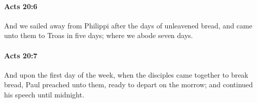 		\paragraph{Acts 20:6} %
			\label{ACTS-20-6}

			And we sailed away from Philippi after the days of unleavened bread, and came unto them to Troas in five days; where we abode seven days.

			\begin{framed}
			\scriptsize
				\begin{compactdesc}
					\item[SBLG] 
				\end{compactdesc}
			\end{framed}

		\paragraph{Acts 20:7} %
			\label{ACTS-20-7}

			And upon the first day of the week, when the disciples came together to break bread, Paul preached unto them, ready to depart on the morrow; and continued his speech until midnight.

